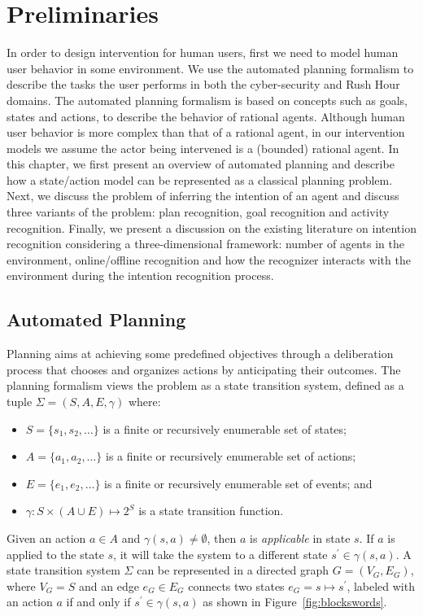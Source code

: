 \chapter{Preliminaries}
\label{chap:ch2}
In order to design intervention for human users, first we need to model human user behavior in some environment. 
We use the automated planning formalism \cite{nau2004} to describe the tasks the user performs in both the cyber-security and Rush Hour domains. 
The automated planning formalism is based on concepts such as goals, states and actions, to describe the behavior of rational agents. 
Although human user behavior is more complex than that of a rational agent, in our intervention models we assume the actor being intervened is a (bounded) rational agent.
In this chapter, we first present an overview of automated planning and describe how a state/action model can be represented as a classical planning problem. Next, we discuss the problem of inferring the intention of an agent and discuss three variants of the problem: plan recognition, goal recognition and activity recognition. Finally, we present a discussion on the existing literature on intention recognition considering a three-dimensional framework: number of agents in the environment, online/offline recognition and how the recognizer interacts with the environment during the intention recognition process.

\section{Automated Planning}
Planning aims at achieving some predefined objectives through a deliberation process that chooses and organizes actions by anticipating their outcomes. The planning formalism views the problem as a state transition system, defined as a tuple $\Sigma=(S,A,E,\gamma)$ where:
\begin{itemize}
\item $S = \lbrace s_1, s_2, \ldots \rbrace$ is a finite or recursively enumerable set of states;
\item $A = \lbrace a_1, a_2, \ldots \rbrace$ is a finite or recursively enumerable set of actions;
\item $E = \lbrace e_1, e_2, \ldots \rbrace$ is a finite or recursively enumerable set of events; and
\item $\gamma: S\times(A\cup E)\mapsto 2^S$ is a state transition function.
\end{itemize}
Given an action $a\in A$ and $\gamma(s,a)\neq\emptyset$, then $a$ is \textit{applicable} in state $s$. If $a$ is applied to the state $s$, it will take the system to a different state $s^\prime\in \gamma(s,a)$. A state transition system $\Sigma$ can be represented in a directed graph $G=(V_G,E_G)$, where $V_G=S$ and an edge $e_G\in E_G$ connects two states $e_G=s\mapsto s^\prime$, labeled with an action $a$ if and only if $s^\prime \in \gamma(s,a)$ as shown in Figure~\ref{fig:blockswords}. 

